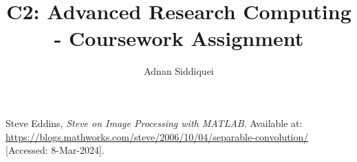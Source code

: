 \documentclass[a4paper,11pt]{article}
\title{\boldmath C2: Advanced Research Computing - Coursework Assignment}
\author{Adnan Siddiquei}
\affiliation{University of Cambridge}
\begin{document}
\maketitle
\flushbottom




% 
% 
% 
% 



\begin{thebibliography}{99}

Steve Eddins,
\textit{Steve on Image Processing with MATLAB}.
Available at: \url{https://blogs.mathworks.com/steve/2006/10/04/separable-convolution/}
[Accessed: 8-Mar-2024].

\end{thebibliography}
\end{document}
